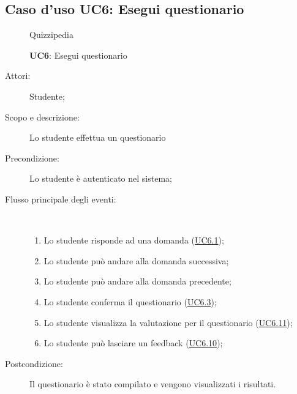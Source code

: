 \subsection{Caso d'uso UC6: Esegui questionario}
\begin{figure}[H]
	\centering
	\begin{resizedtikzpicture}{\textwidth}
		\begin{umlsystem}[x=0, fill=lightgray!20]{Quizzipedia}
		\end{umlsystem}
	\end{resizedtikzpicture}
	\caption{\textbf{UC6}: Esegui questionario}
	\label{UC6}
\end{figure}
\begin{description}
	\item[Attori:] Studente;
	\item[Scopo e descrizione:] Lo studente effettua un questionario
	\item[Precondizione:] Lo studente è autenticato nel sistema;
	
	\item[Flusso principale degli eventi:] \ 
	\begin{enumerate}
		\item Lo studente risponde ad una domanda (\hyperlink{UC6.1}{UC6.1});
		\item Lo studente può andare alla domanda successiva;
		\item Lo studente può andare alla domanda precedente;
		\item Lo studente conferma il questionario (\hyperlink{UC6.3}{UC6.3});
		\item Lo studente visualizza la valutazione per il questionario (\hyperlink{UC6.11}{UC6.11});
		\item Lo studente può lasciare un feedback (\hyperlink{UC6.10}{UC6.10});
		
	\end{enumerate}
	\item[Postcondizione:] Il questionario è stato compilato e vengono visualizzati i risultati.
\end{description}
\hypertarget{UC6.1}{}
